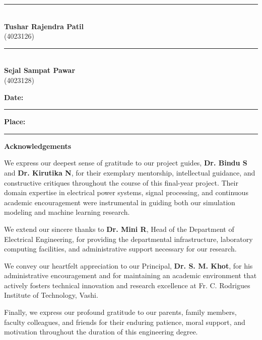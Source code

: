 \documentclass[12pt,a4paper]{report}
\begin{document}
\vspace{2.5cm}

\noindent
\begin{minipage}[t]{0.45\textwidth}
\centering
\rule{6cm}{0.4pt} \\[0.2cm]
\textbf{Tushar Rajendra Patil} \\
(4023126)
\end{minipage}
\hfill
\begin{minipage}[t]{0.45\textwidth}
\centering
\rule{6cm}{0.4pt} \\[0.2cm]
\textbf{Sejal Sampat Pawar} \\
(4023128)
\end{minipage}

\vspace{1.5cm}
\noindent
\textbf{Date:} \rule{4cm}{0.4pt} \hfill \textbf{Place:} \rule{4cm}{0.4pt}
\clearpage

\begin{center}
    \vspace*{1.5cm}
    \textbf{\LARGE Acknowledgements}\\[1.5cm]
\end{center}
We express our deepest sense of gratitude to our project guides, \textbf{Dr. Bindu S} and \textbf{Dr. Kirutika N}, for their exemplary mentorship, intellectual guidance, and constructive critiques throughout the course of this final-year project. Their domain expertise in electrical power systems, signal processing, and continuous academic encouragement were instrumental in guiding both our simulation modeling and machine learning research.

We extend our sincere thanks to \textbf{Dr. Mini R}, Head of the Department of Electrical Engineering, for providing the departmental infrastructure, laboratory computing facilities, and administrative support necessary for our research.

We convey our heartfelt appreciation to our Principal, \textbf{Dr. S. M. Khot}, for his administrative encouragement and for maintaining an academic environment that actively fosters technical innovation and research excellence at Fr. C. Rodrigues Institute of Technology, Vashi.

Finally, we express our profound gratitude to our parents, family members, faculty colleagues, and friends for their enduring patience, moral support, and motivation throughout the duration of this engineering degree.
\clearpage
\end{document}
